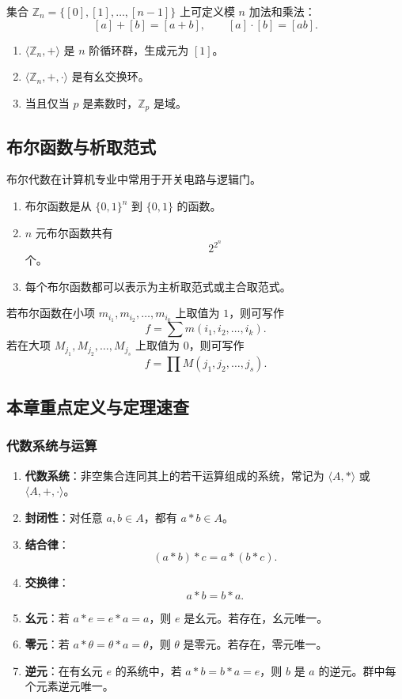 集合 \(\mathbb Z_n=\{[0],[1],\dots,[n-1]\}\) 上可定义模 \(n\) 加法和乘法：
\[
[a]+[b]=[a+b],\qquad [a]\cdot[b]=[ab].
\]

\begin{enumerate}
	\item \(\langle\mathbb Z_n,+\rangle\) 是 \(n\) 阶循环群，生成元为 \([1]\)。
	\item \(\langle\mathbb Z_n,+,\cdot\rangle\) 是有幺交换环。
	\item 当且仅当 \(p\) 是素数时，\(\mathbb Z_p\) 是域。
\end{enumerate}

\subsection{布尔函数与析取范式}

布尔代数在计算机专业中常用于开关电路与逻辑门。
\begin{enumerate}
	\item 布尔函数是从 \(\{0,1\}^n\) 到 \(\{0,1\}\) 的函数。
	\item \(n\) 元布尔函数共有
	\[
	2^{2^n}
	\]
	个。
	\item 每个布尔函数都可以表示为主析取范式或主合取范式。
\end{enumerate}

若布尔函数在小项 \(m_{i_1},m_{i_2},\dots,m_{i_k}\) 上取值为 \(1\)，则可写作
\[
f=\sum m(i_1,i_2,\dots,i_k).
\]
若在大项 \(M_{j_1},M_{j_2},\dots,M_{j_s}\) 上取值为 \(0\)，则可写作
\[
f=\prod M(j_1,j_2,\dots,j_s).
\]

\subsection{本章重点定义与定理速查}

\subsubsection{代数系统与运算}

\begin{enumerate}
	\item \textbf{代数系统}：非空集合连同其上的若干运算组成的系统，常记为 \(\langle A,*\rangle\) 或 \(\langle A,+,\cdot\rangle\)。
	\item \textbf{封闭性}：对任意 \(a,b\in A\)，都有 \(a*b\in A\)。
	\item \textbf{结合律}：
	\[
	(a*b)*c=a*(b*c).
	\]
	\item \textbf{交换律}：
	\[
	a*b=b*a.
	\]
	\item \textbf{幺元}：若 \(a*e=e*a=a\)，则 \(e\) 是幺元。若存在，幺元唯一。
	\item \textbf{零元}：若 \(a*\theta=\theta*a=\theta\)，则 \(\theta\) 是零元。若存在，零元唯一。
	\item \textbf{逆元}：在有幺元 \(e\) 的系统中，若 \(a*b=b*a=e\)，则 \(b\) 是 \(a\) 的逆元。群中每个元素逆元唯一。
\end{enumerate}

